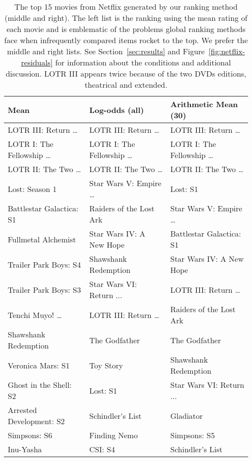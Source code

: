 \documentclass{sig-alternate}
\begin{document}
\begin{table*}
\caption{The top 15 movies from Netflix generated by our ranking method 
(middle and right).  The left list is the ranking using the
mean rating of each movie and is
emblematic of the problems global ranking methods face when
infrequently compared items rocket to the top.  We prefer the middle and
right lists.  See Section~\ref{sec:results} and Figure~\ref{fig:netflix-residuals}
for information about the conditions and additional discussion.  
LOTR III appears twice because of the 
two DVDs editions, theatrical and extended.}
\label{tab:netflix-top-movies}
\begin{tabularx}{\linewidth}{XXX}
\toprule
		Mean	& 		Log-odds (all)	&		Arithmetic Mean (30)
\\ \midrule		
		  LOTR III: Return \ldots	&		LOTR III: Return \ldots	&		LOTR III: Return \ldots
\\		LOTR I: The Fellowship \ldots	&		LOTR I: The Fellowship \ldots	&		LOTR I: The Fellowship \ldots
\\		LOTR II: The Two \ldots	&		LOTR II: The Two \ldots	&		LOTR II: The Two \ldots
\\		Lost: Season 1	&		Star Wars V: Empire \ldots	&		Lost: S1
\\		Battlestar Galactica: S1	&		Raiders of the Lost Ark	&		Star Wars V: Empire \ldots
\\		Fullmetal Alchemist	&		Star Wars IV: A New Hope	&		Battlestar Galactica: S1
\\		Trailer Park Boys: S4	&		Shawshank Redemption	&		Star Wars IV: A New Hope
\\		Trailer Park Boys: S3	&		Star Wars VI: Return ...	&		LOTR III: Return \ldots
\\		Tenchi Muyo! \ldots	&		LOTR III: Return \ldots	&		Raiders of the Lost Ark
\\		Shawshank Redemption	&		The Godfather	&		The Godfather
\\		Veronica Mars: S1	&		Toy Story	&		Shawshank Redemption
\\		Ghost in the Shell: S2	&		Lost: S1	&		Star Wars VI: Return ...
\\		Arrested Development: S2	&		Schindler's List	&		Gladiator
\\		Simpsons: S6	&		Finding Nemo	&		Simpsons: S5
\\		Inu-Yasha	&		CSI: S4	&		Schindler's List
\\ \bottomrule
\end{tabularx}
\end{table*}
\end{document}
